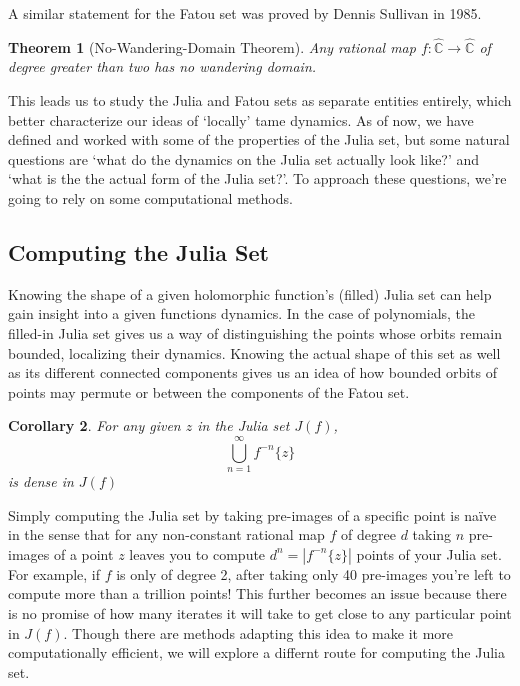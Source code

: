 \documentclass{amsart}
\newcommand{\bbC}{\mathbb{C}}
\newcommand{\bbCS}{\hat{\bbC}}
\newcommand{\abs}[1]{ \left| #1 \right| }
\newtheorem{thm}{Theorem}[section]
\newtheorem{cor}[thm]{Corollary}
\theoremstyle{definition}
\theoremstyle{remark}
\numberwithin{equation}{section}
\begin{document}
A similar statement for the Fatou set was proved by Dennis Sullivan in 1985.
\begin{thm}[No-Wandering-Domain Theorem]\cite{sullivan1985quasiconformal}\label{NWDT}
  Any rational map $f\colon\bbCS\to\bbCS$ of degree greater than two has no wandering domain.
\end{thm}

This leads us to study the Julia and Fatou sets as separate entities entirely, which better characterize our ideas of `locally' tame dynamics. As of now, we have defined and worked with some of the properties of the Julia set, but some natural questions are `what do the dynamics on the Julia set actually look like?' and `what is the the actual form of the Julia set?'. To approach these questions, we're going to rely on some computational methods.

  \subsection{Computing the Julia Set}\label{JuliaComp}

Knowing the shape of a given holomorphic function's (filled) Julia set can help gain insight into a given functions dynamics. In the case of polynomials, the filled-in Julia set gives us a way of distinguishing the points whose orbits remain bounded, localizing their dynamics. Knowing the actual shape of this set as well as its different connected components gives us an idea of how bounded orbits of points may permute or between the components of the Fatou set.

\begin{cor}\cite[Corollary 4.13]{milnor2011}
For any given $z$ in the Julia set $J(f)$,
\[
\bigcup_{n=1}^{\infty}f^{-n}\{z\}
\]is dense in $J(f)$
\end{cor}

Simply computing the Julia set by taking pre-images of a specific point is na\"ive in the sense that for any non-constant rational map $f$ of degree $d$ taking $n$ pre-images of a point $z$ leaves you to compute $d^n=\abs{f^{-n}\{z\}}$ points of your Julia set. For example, if $f$ is only of degree 2, after taking only 40 pre-images you're left to compute more than a trillion points! This further becomes an issue because there is no promise of how many iterates it will take to get close to any particular point in $J(f)$. Though there are methods adapting this idea to make it more computationally efficient, we will explore a differnt route for computing the Julia set.
\end{document}
